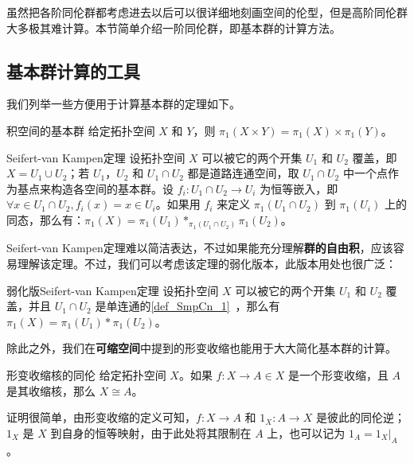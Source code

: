 

虽然把各阶同伦群都考虑进去以后可以很详细地刻画空间的伦型，但是高阶同伦群大多极其难计算。本节简单介绍一阶同伦群，即基本群的计算方法。

\subsection{基本群计算的工具}

我们列举一些方便用于计算基本群的定理如下。

\begin{theorem}{积空间的基本群}
给定拓扑空间 $X$ 和 $Y$，则 $\pi_1(X\times Y)=\pi_1(X)\times\pi_1(Y)$。
\end{theorem}

\begin{theorem}{Seifert-van Kampen定理}
设拓扑空间 $X$ 可以被它的两个开集 $U_1$ 和 $U_2$ 覆盖，即 $X=U_1\cup U_2$；若 $U_1$，$U_2$ 和 $U_1\cap U_2$ 都是道路连通空间，取 $U_1\cap U_2$ 中一个点作为基点来构造各空间的基本群。设 $f_i:U_1\cap U_2\rightarrow U_i$ 为恒等嵌入，即 $\forall x\in U_1\cap U_2, f_i(x)=x\in U_i$。如果用 $f_i$ 来定义 $\pi_1(U_1\cap U_2)$ 到 $\pi_1(U_i)$ 上的同态，那么有：$\pi_1(X)=\pi_1(U_1)*_{\pi_1(U_1\cap U_2)}\pi_1(U_2)$。
\end{theorem}

Seifert-van Kampen定理难以简洁表达，不过如果能充分理解\textbf{群的自由积}，应该容易理解该定理。不过，我们可以考虑该定理的弱化版本，此版本用处也很广泛：

\begin{theorem}{弱化版Seifert-van Kampen定理}
设拓扑空间 $X$ 可以被它的两个开集 $U_1$ 和 $U_2$ 覆盖，并且 $U_1\cap U_2$ 是单连通的\autoref{def_SmpCn_1}~，那么有 $\pi_1(X)=\pi_1(U_1)*\pi_1(U_2)$。
\end{theorem}

除此之外，我们在\textbf{可缩空间}中提到的形变收缩也能用于大大简化基本群的计算。

\begin{theorem}{形变收缩核的同伦}\label{the_HomT5_1}
给定拓扑空间 $X$。如果 $f:X\rightarrow A\in X$ 是一个形变收缩，且 $A$ 是其收缩核，那么 $X\cong A$。
\end{theorem}

证明很简单，由形变收缩的定义可知，$f:X\rightarrow A$ 和 $1_X:A\rightarrow X$ 是彼此的同伦逆；$1_X$ 是 $X$ 到自身的恒等映射，由于此处将其限制在 $A$ 上，也可以记为 $1_A=1_X|_A$。

